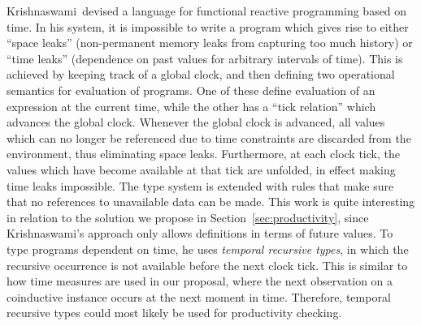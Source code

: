 Krishnaswami\,\citep{Krishnaswami13} devised a language for functional reactive programming based on time. In his system, it is impossible to write a program which gives rise to either ``space leaks'' (non-permanent memory leaks from capturing too much history) or ``time leaks'' (dependence on past values for arbitrary intervals of time). This is achieved by keeping track of a global clock, and then defining two operational semantics for evaluation of programs. One of these define evaluation of an expression at the current time, while the other has a ``tick relation'' which advances the global clock. Whenever the global clock is advanced, all values which can no longer be referenced due to time constraints are discarded from the environment, thus eliminating space leaks. Furthermore, at each clock tick, the values which have become available at that tick are unfolded, in effect making time leaks impossible. The type system is extended with rules that make sure that no references to unavailable data can be made. This work is quite interesting in relation to the solution we propose in Section~\ref{sec:productivity}, since Krishnaswami's approach only allows definitions in terms of future values. To type programs dependent on time, he uses \emph{temporal recursive types}, in which the recursive occurrence is not available before the next clock tick. This is similar to how time measures are used in our proposal, where the next observation on a coinductive instance occurs at the next moment in time. Therefore, temporal recursive types could most likely be used for productivity checking.

